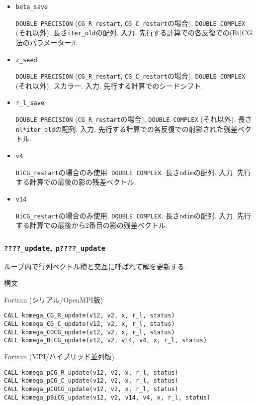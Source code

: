\documentclass[12pt,titlepage]{jarticle}
\begin{document}
\begin{itemize}
\item \verb|beta_save|

  \verb|DOUBLE PRECISION| (\verb|CG_R_restart|, \verb|CG_C_restart|の場合),
  \verb|DOUBLE COMPLEX| (それ以外).
  長さ\verb|iter_old|の配列. 入力. 先行する計算での各反復での(Bi)CG法のパラメーター$\beta$.

\item \verb|z_seed|

  \verb|DOUBLE PRECISION| (\verb|CG_R_restart|, \verb|CG_C_restart|の場合),
  \verb|DOUBLE COMPLEX| (それ以外).
  スカラー. 入力. 先行する計算でのシードシフト.

\item \verb|r_l_save|
  
  \verb|DOUBLE PRECISION| (\verb|CG_R_restart|の場合),
  \verb|DOUBLE COMPLEX| (それ以外).
  長さ\verb|nl*iter_old|の配列. 入力.
  先行する計算での各反復での射影された残差ベクトル.

\item \verb|v4|

  \verb|BiCG_restart|の場合のみ使用.
  \verb|DOUBLE COMPLEX|.
  長さ\verb|ndim|の配列. 入力.
  先行する計算での最後の影の残差ベクトル.

\item \verb|v14|

  \verb|BiCG_restart|の場合のみ使用.
  \verb|DOUBLE COMPLEX|.
  長さ\verb|ndim|の配列. 入力.
  先行する計算での最後から2番目の影の残差ベクトル.

\end{itemize}

\subsubsection{\texttt{????\_update}, \texttt{p????\_update}}

ループ内で行列ベクトル積と交互に呼ばれて解を更新する.

\noindent 構文

\noindent Fortran (シリアル/OpenMPI版)
\begin{verbatim}
CALL komega_CG_R_update(v12, v2, x, r_l, status)
CALL komega_CG_C_update(v12, v2, x, r_l, status)
CALL komega_COCG_update(v12, v2, x, r_l, status)
CALL komega_BiCG_update(v12, v2, v14, v4, x, r_l, status)
\end{verbatim}

\noindent Fortran (MPI/ハイブリッド並列版)
\begin{verbatim}
CALL komega_pCG_R_update(v12, v2, x, r_l, status)
CALL komega_pCG_C_update(v12, v2, x, r_l, status)
CALL komega_pCOCG_update(v12, v2, x, r_l, status)
CALL komega_pBiCG_update(v12, v2, v14, v4, x, r_l, status)
\end{verbatim}
\end{document}

